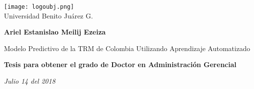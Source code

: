 \begin{titlepage}
\begin{center}
\vspace*{1cm}    

\texttt{[image: logoubj.png]} \\
\large{Universidad Benito Juárez G.}

\vspace{3cm}
\textbf{Ariel Estanislao Meilij Ezeiza}

\vspace{3cm}
\huge
Modelo Predictivo de la TRM de Colombia Utilizando Aprendizaje Automatizado

\vspace{3cm}
\large
\textbf{Tesis para obtener el grado de Doctor en Administración Gerencial}

\vspace{4cm}
\small
\textit{Julio 14 del 2018}

\end{center}
\end{titlepage}
